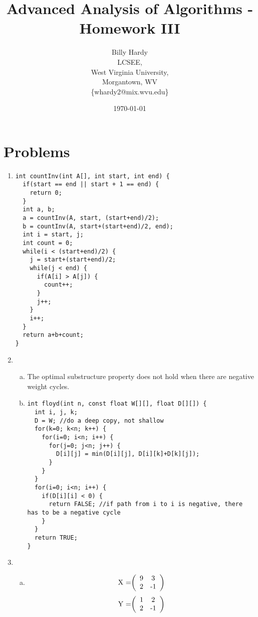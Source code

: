 \documentclass[10pt]{article}
\title{Advanced Analysis of Algorithms - Homework III}
\author{
 Billy Hardy \\ LCSEE, \\
 West Virginia University, \\ Morgantown, WV \\
\mbox\{whardy2@mix.wvu.edu\}}
\begin{document}
\date{\today}
\maketitle


\section{Problems}
\begin{enumerate}

\item%
\begin{verbatim}
int countInv(int A[], int start, int end) {
  if(start == end || start + 1 == end) {
    return 0;
  }
  int a, b;
  a = countInv(A, start, (start+end)/2);
  b = countInv(A, start+(start+end)/2, end);
  int i = start, j;
  int count = 0;
  while(i < (start+end)/2) {
    j = start+(start+end)/2;
    while(j < end) {
      if(A[i] > A[j]) {
        count++;
      }
      j++;
    }
    i++;
  }
  return a+b+count;
}
\end{verbatim}

\item%

\begin{enumerate}[a)]

\item%
The optimal substructure property does not hold when there are negative weight cycles.

\item%
\begin{verbatim}
int floyd(int n, const float W[][], float D[][]) {
  int i, j, k;
  D = W; //do a deep copy, not shallow
  for(k=0; k<n; k++) {
    for(i=0; i<n; i++) {
      for(j=0; j<n; j++) {
        D[i][j] = min(D[i][j], D[i][k]+D[k][j]);
      }
    }
  }
  for(i=0; i<n; i++) {
    if(D[i][i] < 0) {
      return FALSE; //if path from i to i is negative, there has to be a negative cycle
    }
  }
  return TRUE;
}
\end{verbatim}

\end{enumerate}

\item%

\begin{enumerate}[a)]

\item%
\[ $X =$ \left( \begin{array}{cc}
$9$ & $3$ \\
$2$ & $-1$ \end{array} \right)\] 
\[ $Y =$ \left( \begin{array}{cc}
$1$ & $2$ \\
$2$ & $-1$ \end{array} \right)\]


\end{enumerate}
\end{enumerate}
\end{document}
